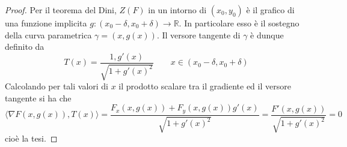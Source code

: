 \begin{proof}
    Per il teorema del Dini, $Z(F)$ in un intorno di $(x_0, y_0)$ è il grafico di una funzione implicita $g: (x_0- \delta, x_0+ \delta) \to \mathbb{R}$. In particolare esso è il sostegno della curva parametrica $\gamma = (x, g(x))$. Il versore tangente di $\gamma$ è dunque definito da
    \begin{equation}
        T(x)= \frac{1, g'(x)}{\sqrt{1+g'(x)^2}} \qquad x \in (x_0- \delta, x_0+ \delta)
    \end{equation}
    Calcolando per tali valori di $x$ il prodotto scalare tra il gradiente ed il versore tangente si ha che
    \begin{equation}
        \langle \nabla F (x, g(x)), T(x) \rangle= \frac{F_x(x, g(x)) + F_y(x, g(x))g'(x)}{\sqrt{1+g'(x)^2}}=\frac{F'(x, g(x))}{\sqrt{1+g'(x)^2}}=0
    \end{equation}
    cioè la tesi.
\end{proof}

